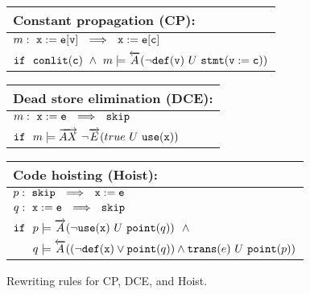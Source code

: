 \begin{figure}[ht]

\begin{small}

\begin{tabularx}{0.8\textwidth}{|X|}\hline
{\bf Constant propagation} (CP):\\\hline
$m: ~ {\tt x:=e[v]} ~~ \Longrightarrow ~~ {\tt x:=e[c]}$ \\
${\tt if} ~~ \text{${\tt conlit}$}(\text{${\tt c}$}) ~ \wedge ~ m \models \overleftarrow{A}(\neg\text{${\tt def}$}(\text{${\tt v}$}) ~ U ~ \text{${\tt stmt}$}({\tt v:=c}))$ \\\hline
\end{tabularx}

\vspace{2mm}

\begin{tabularx}{0.8\textwidth}{|X|}\hline
{\bf Dead store elimination} (DCE):\\\hline
$m: ~ {\tt x:=e} ~~ \Longrightarrow ~~ {\tt skip}$ \\
${\tt if} ~~ m \models \overrightarrow{AX} ~ \neg\overrightarrow{E}(true ~ U ~ \text{${\tt use}$}(\text{${\tt x}$}))$ \\\hline
\end{tabularx}

\vspace{2mm}

\begin{tabularx}{0.8\textwidth}{|X|}\hline
{\bf Code hoisting} (Hoist):\\\hline
$p: ~ {\tt skip} ~~ \Longrightarrow ~~ {\tt x:=e}$ \\
$q: ~ {\tt x:=e} ~~ \Longrightarrow ~~ {\tt skip}$ \\
${\tt if} ~~ p \models \overrightarrow{A}(\neg\text{${\tt use}$}(\text{${\tt x}$}) ~ U ~ \text{${\tt point}$}(q)) ~~ \wedge$ \\
$\hphantom{\texttt{if}} ~~ q \models \overleftarrow{A}((\neg\wdef(\wx)\vee\wpoint(q))\wedge \wtrans(e) ~ U ~ \wpoint(p))$ \\\hline
\end{tabularx}

\end{small}
\caption{\label{fig:sample-trans} Rewriting rules for CP, DCE, and Hoist.}
\end{figure}

